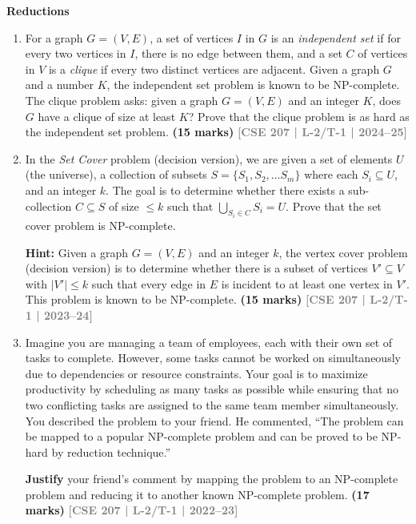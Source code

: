 \documentclass[12pt,a3paper]{article}
\newcommand{\yr}[1]{\hfill\textcolor{gray}{\small\textbf{[#1]}}}
\newcommand{\mk}[1]{\textcolor{orange!70!black}{\small\textbf{(#1 marks)}}}
\newcommand{\subtopic}[2]{%
  \vspace{10pt}
  \noindent\begin{tcolorbox}[colback=#1!8,colframe=#1,boxrule=0.6pt,arc=4pt,
    left=6pt,right=6pt,top=4pt,bottom=4pt]
    \small\bfseries\textcolor{#1}{#2}
  \end{tcolorbox}
  \vspace{2pt}
}
\begin{document}
\subtopic{cD}{Reductions}
\label{sub:s4-reductions}

\begin{enumerate}

\item For a graph $G = (V, E)$, a set of vertices $I$ in $G$ is an \textit{independent set} if for every two vertices in $I$, there is no edge between them, and a set $C$ of vertices in $V$ is a \textit{clique} if every two distinct vertices are adjacent. Given a graph $G$ and a number $K$, the independent set problem is known to be NP-complete. The clique problem asks: given a graph $G = (V, E)$ and an integer $K$, does $G$ have a clique of size at least $K$? Prove that the clique problem is as hard as the independent set problem.
\mk{15} \yr{CSE 207 | L-2/T-1 | 2024--25}

\item In the \textit{Set Cover} problem (decision version), we are given a set of elements $U$ (the 
universe), a collection of subsets $S = \{S_1, S_2, \dots S_m\}$ where each $S_i \subseteq U$, and an integer 
$k$. The goal is to determine whether there exists a sub-collection $C \subseteq S$ of size $\le k$ such 
that $\bigcup_{S_i \in C} S_i = U$. Prove that the set cover problem is NP-complete.

\textbf{Hint:} Given a graph $G = (V, E)$ and an integer $k$, the vertex cover problem (decision 
version) is to determine whether there is a subset of vertices $V' \subseteq V$ with $|V'| \le k$ such 
that every edge in $E$ is incident to at least one vertex in $V'$. This problem is known to be 
NP-complete.
\mk{15} \yr{CSE 207 | L-2/T-1 | 2023--24}

\item Imagine you are managing a team of employees, each with their own set of tasks to 
    complete. However, some tasks cannot be worked on simultaneously due to 
    dependencies or resource constraints. Your goal is to maximize productivity by 
    scheduling as many tasks as possible while ensuring that no two conflicting tasks are 
    assigned to the same team member simultaneously. You described the problem to your 
    friend. He commented, ``The problem can be mapped to a popular NP-complete 
    problem and can be proved to be NP-hard by reduction technique.''
    
    \textbf{Justify} your friend's comment by mapping the problem to an NP-complete problem 
    and reducing it to another known NP-complete problem.
\mk{17} \yr{CSE 207 | L-2/T-1 | 2022--23}


\end{enumerate}
\end{document}
